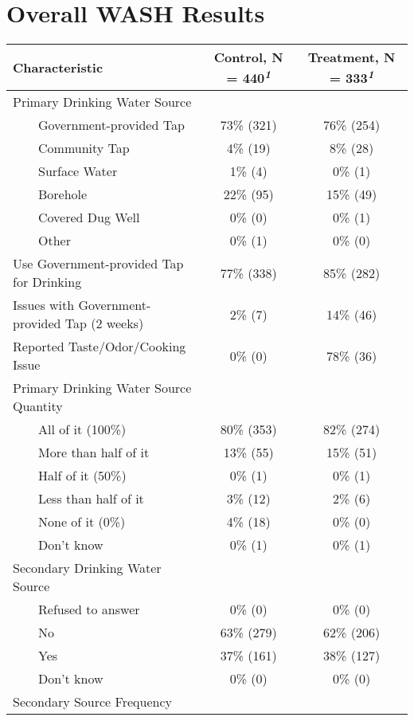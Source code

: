 \documentclass[
]{article}
\begin{document}
\newpage

\hypertarget{overall-wash-results}{%
\section{Overall WASH Results}\label{overall-wash-results}}

\setlength{\LTpost}{0mm}
\begin{longtable}{lcc}
\toprule
\textbf{Characteristic} & \textbf{Control}, N = 440\textsuperscript{\textit{1}} & \textbf{Treatment}, N = 333\textsuperscript{\textit{1}} \\ 
\midrule\addlinespace[2.5pt]
Primary Drinking Water Source &  &  \\ 
    Government-provided Tap & 73\% (321) & 76\% (254) \\ 
    Community Tap & 4\% (19) & 8\% (28) \\ 
    Surface Water & 1\% (4) & 0\% (1) \\ 
    Borehole & 22\% (95) & 15\% (49) \\ 
    Covered Dug Well & 0\% (0) & 0\% (1) \\ 
    Other & 0\% (1) & 0\% (0) \\ 
Use Government-provided Tap for Drinking & 77\% (338) & 85\% (282) \\ 
Issues with Government-provided Tap (2 weeks) & 2\% (7) & 14\% (46) \\ 
Reported Taste/Odor/Cooking Issue & 0\% (0) & 78\% (36) \\ 
Primary Drinking Water Source Quantity &  &  \\ 
    All of it (100\%) & 80\% (353) & 82\% (274) \\ 
    More than half of it & 13\% (55) & 15\% (51) \\ 
    Half of it (50\%) & 0\% (1) & 0\% (1) \\ 
    Less than half of it & 3\% (12) & 2\% (6) \\ 
    None of it (0\%) & 4\% (18) & 0\% (0) \\ 
    Don’t know & 0\% (1) & 0\% (1) \\ 
Secondary Drinking Water Source &  &  \\ 
    Refused to answer & 0\% (0) & 0\% (0) \\ 
    No & 63\% (279) & 62\% (206) \\ 
    Yes & 37\% (161) & 38\% (127) \\ 
    Don't know & 0\% (0) & 0\% (0) \\ 
Secondary Source Frequency &  &  \\ 

\end{longtable}
\end{document}
